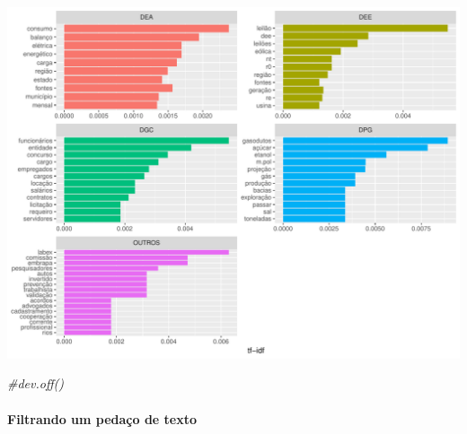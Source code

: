 \documentclass[]{article}
\newenvironment{Shaded}{\begin{snugshade}}{\end{snugshade}}
\newcommand{\KeywordTok}[1]{\textcolor[rgb]{0.13,0.29,0.53}{\textbf{#1}}}
\newcommand{\StringTok}[1]{\textcolor[rgb]{0.31,0.60,0.02}{#1}}
\newcommand{\CommentTok}[1]{\textcolor[rgb]{0.56,0.35,0.01}{\textit{#1}}}
\newcommand{\OperatorTok}[1]{\textcolor[rgb]{0.81,0.36,0.00}{\textbf{#1}}}
\newcommand{\NormalTok}[1]{#1}
\let\oldparagraph\paragraph
\renewcommand{\paragraph}[1]{\oldparagraph{#1}\mbox{}}
\begin{document}
\includegraphics{markdown_v10_files/figure-latex/02_freq_palavras_dir-1.pdf}

\begin{Shaded}
\begin{Highlighting}[]
\CommentTok{#dev.off()}
\end{Highlighting}
\end{Shaded}

\paragraph{Filtrando um pedaço de
texto}\label{filtrando-um-pedaco-de-texto}

\begin{Shaded}
\end{Shaded}
\end{document}
